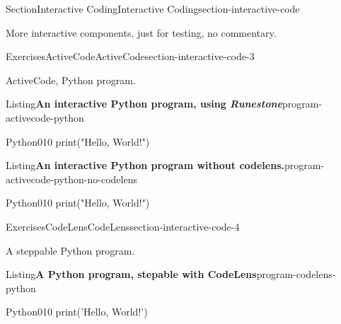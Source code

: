 \documentclass[twoside,10pt,]{article}
\newcommand{\pubtitle}[1]{\textsl{#1}}
\numberwithin{equation}{section}
\begin{document}
\begin{sectionptx}{Section}{Interactive Coding}{}{Interactive Coding}{}{}{section-interactive-code}
\begin{introduction}{}%
More interactive components, just for testing, no commentary.%
\end{introduction}%
%
%
\typeout{************************************************}
\typeout{************************************************}
%
\begin{exercises-subsection}{Exercises}{ActiveCode}{}{ActiveCode}{}{}{section-interactive-code-3}
\begin{introduction}{}%
ActiveCode, Python program.%
\end{introduction}%
\begin{listingptx}{Listing}{\textbf{An interactive Python program, using \pubtitle{Runestone}}}{program-activecode-python}{}%
\begin{program}{Python}{0}{1}{0}
print("Hello, World!")
\end{program}
\end{listingptx}%
\begin{listingptx}{Listing}{\textbf{An interactive Python program without codelens.}}{program-activecode-python-no-codelens}{}%
\begin{program}{Python}{0}{1}{0}
print("Hello, World!")
\end{program}
\end{listingptx}%
\end{exercises-subsection}
%
%
\typeout{************************************************}
\typeout{************************************************}
%
\begin{exercises-subsection}{Exercises}{CodeLens}{}{CodeLens}{}{}{section-interactive-code-4}
\begin{introduction}{}%
A steppable Python program.%
\end{introduction}%
\begin{listingptx}{Listing}{\textbf{A Python program, stepable with CodeLens}}{program-codelens-python}{}%
\begin{program}{Python}{0}{1}{0}
print('Hello, World!')
\end{program}
\end{listingptx}%
\end{exercises-subsection}
%
%
\typeout{************************************************}
\typeout{************************************************}

\end{sectionptx}
\end{document}
